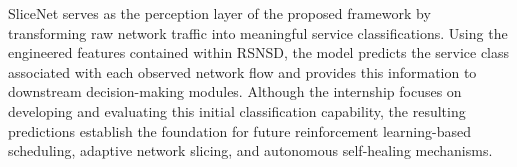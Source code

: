 \documentclass[12pt,a4paper]{report}
\begin{document}
	SliceNet serves as the perception layer of the proposed framework by transforming raw network traffic into meaningful service classifications. Using the engineered features contained within RSNSD, the model predicts the service class associated with each observed network flow and provides this information to downstream decision-making modules. Although the internship focuses on developing and evaluating this initial classification capability, the resulting predictions establish the foundation for future reinforcement learning-based scheduling, adaptive network slicing, and autonomous self-healing mechanisms.

\end{document}
